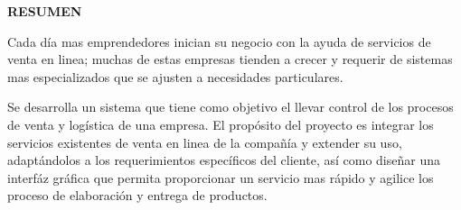 
\begin{center}
  {\Large \bf{RESUMEN}}
\end{center}
Cada día mas emprendedores inician su negocio con la ayuda de servicios de venta en linea; muchas de estas empresas tienden a crecer y requerir de sistemas mas especializados que se ajusten a necesidades particulares.
\vspace{0.8cm}

Se desarrolla un sistema que tiene como objetivo el llevar control de los procesos de venta y logística de una empresa. El propósito del proyecto es integrar los servicios existentes de venta en linea de la compañía y extender su uso, adaptándolos a los requerimientos específicos del cliente, así como diseñar una interfáz gráfica que permita proporcionar un servicio mas rápido y agilice los proceso de elaboración y entrega de productos.